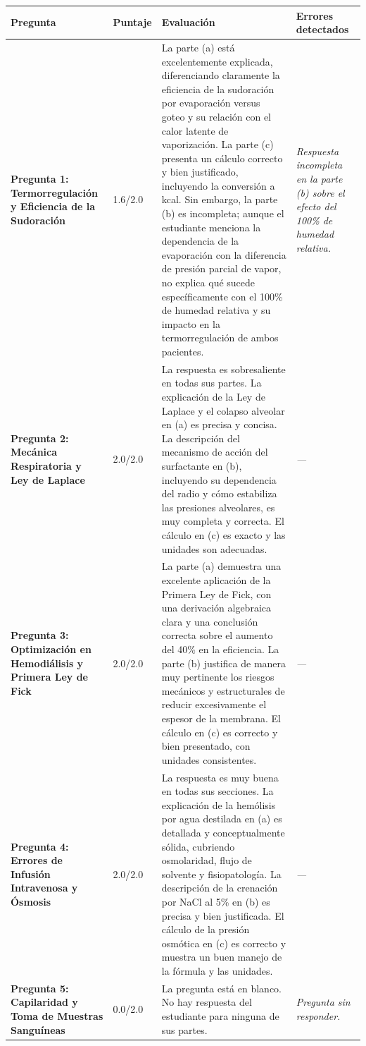 \documentclass[11pt,a4paper]{article}
\begin{document}
\begin{longtable}{>{\bfseries}p{2.8cm} p{1.6cm} p{7.0cm} p{2.8cm}}
  \toprule
  \textbf{Pregunta} & \textbf{Puntaje} & \textbf{Evaluación} & \textbf{Errores detectados} \\
  \midrule
  \endhead
  \bottomrule
  \endfoot
    \textbf{Pregunta 1: Termorregulación y Eficiencia de la Sudoración} & 1.6/2.0 & La parte (a) está excelentemente explicada, diferenciando claramente la eficiencia de la sudoración por evaporación versus goteo y su relación con el calor latente de vaporización. La parte (c) presenta un cálculo correcto y bien justificado, incluyendo la conversión a kcal. Sin embargo, la parte (b) es incompleta; aunque el estudiante menciona la dependencia de la evaporación con la diferencia de presión parcial de vapor, no explica qué sucede específicamente con el 100\% de humedad relativa y su impacto en la termorregulación de ambos pacientes. & \textit{Respuesta incompleta en la parte (b) sobre el efecto del 100\% de humedad relativa.} \\
    \midrule
    \textbf{Pregunta 2: Mecánica Respiratoria y Ley de Laplace} & 2.0/2.0 & La respuesta es sobresaliente en todas sus partes. La explicación de la Ley de Laplace y el colapso alveolar en (a) es precisa y concisa. La descripción del mecanismo de acción del surfactante en (b), incluyendo su dependencia del radio y cómo estabiliza las presiones alveolares, es muy completa y correcta. El cálculo en (c) es exacto y las unidades son adecuadas. & \textit{---} \\
    \midrule
    \textbf{Pregunta 3: Optimización en Hemodiálisis y Primera Ley de Fick} & 2.0/2.0 & La parte (a) demuestra una excelente aplicación de la Primera Ley de Fick, con una derivación algebraica clara y una conclusión correcta sobre el aumento del 40\% en la eficiencia. La parte (b) justifica de manera muy pertinente los riesgos mecánicos y estructurales de reducir excesivamente el espesor de la membrana. El cálculo en (c) es correcto y bien presentado, con unidades consistentes. & \textit{---} \\
    \midrule
    \textbf{Pregunta 4: Errores de Infusión Intravenosa y Ósmosis} & 2.0/2.0 & La respuesta es muy buena en todas sus secciones. La explicación de la hemólisis por agua destilada en (a) es detallada y conceptualmente sólida, cubriendo osmolaridad, flujo de solvente y fisiopatología. La descripción de la crenación por NaCl al 5\% en (b) es precisa y bien justificada. El cálculo de la presión osmótica en (c) es correcto y muestra un buen manejo de la fórmula y las unidades. & \textit{---} \\
    \midrule
    \textbf{Pregunta 5: Capilaridad y Toma de Muestras Sanguíneas} & 0.0/2.0 & La pregunta está en blanco. No hay respuesta del estudiante para ninguna de sus partes. & \textit{Pregunta sin responder.} \\
    \midrule
\end{longtable}
\end{document}
